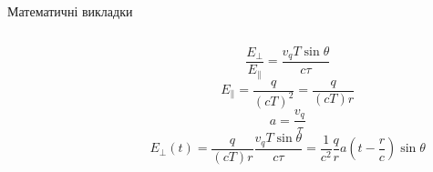 \documentclass[onlytextwidth]{beamer}
\begin{document}
\begin{frame}{Математичні викладки}{}
\begin{columns}
\begin{column}{0.4\linewidth}
\begin{tikzpicture}[>=latex,
					chp/.style = {circle, inner sep=1pt, ball color=red,  font=\tiny\mathstrut\bfseries, text=white, inner sep=0pt},
				]
			\end{tikzpicture}
	\end{column}
	\begin{column}{0.6\linewidth}
         \begin{equation*}
             \frac{E_{\perp}}{E_{\parallel}} = \frac{v_q T\sin\theta}{c\tau}
        \end{equation*}
        \begin{equation*}
            E_{\parallel} = \frac{q}{(cT)^2} = \frac{q}{(cT) r}
        \end{equation*}
\begin{equation*}
    a= \frac{v_q}{\tau}
\end{equation*}
        \begin{equation*}
            E_{\perp}(t) = \frac{q}{(cT) r}  \frac{v_q T\sin\theta}{c\tau} = \frac1{c^2} \frac{q}{r} a\left( t - \frac{r}{c}\right) \sin\theta
        \end{equation*}
	\end{column}
\end{columns}

\end{frame}
\end{document}
